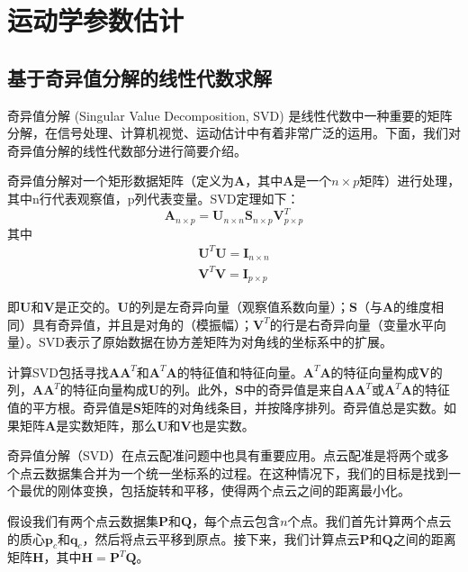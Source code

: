 \section{运动学参数估计}
\subsection{基于奇异值分解的线性代数求解}
奇异值分解\cite{levinson2020analysis} (Singular Value Decomposition, SVD) 是线性代数中一种重要的矩阵分解，在信号处理、计算机视觉、运动估计中有着非常广泛的运用。下面，我们对奇异值分解的线性代数部分进行简要介绍。

奇异值分解对一个矩形数据矩阵（定义为$\boldsymbol{A}$，其中$\boldsymbol{A}$是一个$n \times p$矩阵）进行处理，其中n行代表观察值，p列代表变量。SVD定理如下：
\begin{equation}
\boldsymbol{A}_{n \times p} = \boldsymbol{U}_{n \times n} \boldsymbol{S}_{n \times p} \boldsymbol{V}^T_{p \times p}
\end{equation}
其中
\begin{align}
    \boldsymbol{U}^T \boldsymbol{U} = \boldsymbol{I}_{n \times n} \\
    \boldsymbol{V}^T \boldsymbol{V} = \boldsymbol{I}_{p \times p}
\end{align}

即$\boldsymbol{U}$和$\boldsymbol{V}$是正交的。$\boldsymbol{U}$的列是左奇异向量（观察值系数向量）；$\boldsymbol{S}$（与$\boldsymbol{A}$的维度相同）具有奇异值，并且是对角的（模振幅）；$\boldsymbol{V}^T$的行是右奇异向量（变量水平向量）。SVD表示了原始数据在协方差矩阵为对角线的坐标系中的扩展。

计算SVD包括寻找$\boldsymbol{A} \boldsymbol{A}^T$和$\boldsymbol{A}^T \boldsymbol{A}$的特征值和特征向量。$\boldsymbol{A}^T \boldsymbol{A}$的特征向量构成$\boldsymbol{V}$的列，$\boldsymbol{A} \boldsymbol{A}^T$的特征向量构成$\boldsymbol{U}$的列。此外，$\boldsymbol{S}$中的奇异值是来自$\boldsymbol{A} \boldsymbol{A}^T$或$\boldsymbol{A}^T \boldsymbol{A}$的特征值的平方根。奇异值是$\boldsymbol{S}$矩阵的对角线条目，并按降序排列。奇异值总是实数。如果矩阵$\boldsymbol{A}$是实数矩阵，那么$\boldsymbol{U}$和$\boldsymbol{V}$也是实数。

奇异值分解（SVD）在点云配准问题中也具有重要应用。点云配准是将两个或多个点云数据集合并为一个统一坐标系的过程。在这种情况下，我们的目标是找到一个最优的刚体变换，包括旋转和平移，使得两个点云之间的距离最小化。

假设我们有两个点云数据集$\boldsymbol{P}$和$\boldsymbol{Q}$，每个点云包含$n$个点。我们首先计算两个点云的质心$\boldsymbol{p}_c$和$\boldsymbol{q}_c$，然后将点云平移到原点。接下来，我们计算点云$\boldsymbol{P}$和$\boldsymbol{Q}$之间的距离矩阵$\boldsymbol{H}$，其中$\boldsymbol{H}=\boldsymbol{P}^T\boldsymbol{Q}$。

